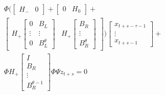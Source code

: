 \documentclass{article}
\begin{document}
{\begin{multline*}
\Phi  (\begin{bmatrix}
H_-&0
  \end{bmatrix} + 
  \begin{bmatrix}
    0&H_0
  \end{bmatrix} + \\
  \begin{bmatrix}
    H_+ \begin{bmatrix}
    0&B_L\\\vdots&\vdots\\0&B^\theta_L
  \end{bmatrix}& H_+\begin{bmatrix}
    B_R\\\vdots\\B^\theta_R
  \end{bmatrix}
  \end{bmatrix})  \begin{bmatrix}
    x_{t+s-\tau-1}\\\vdots\\x_{t+s-1}
  \end{bmatrix}+ \\ \Phi H_+\begin{bmatrix}
I\\B_R\\\vdots\\B^{\theta-1}_R
  \end{bmatrix} \Phi \Psi z_{t+s}=0
\end{multline*}

}
\end{document}
